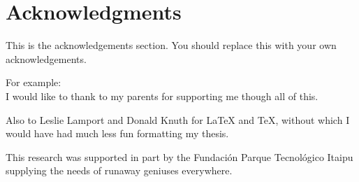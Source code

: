 \section*{Acknowledgments}

This is the acknowledgements section.  You should replace this with your
own acknowledgements.

For example:\\
I would like to thank to my
parents for supporting me though all of this.

Also to Leslie Lamport and Donald Knuth for \LaTeX{} and \TeX{}, without which
I would have had much less fun formatting my thesis.

This research was supported in part by the Fundaci\'on Parque Tecnol\'ogico Itaipu 
supplying the needs of runaway geniuses everywhere.


